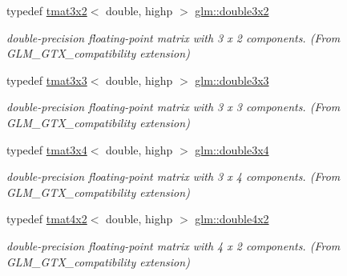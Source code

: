 \begin{DoxyCompactItemize}
typedef \hyperlink{structglm_1_1tmat3x2}{tmat3x2}$<$ double, highp $>$ \hyperlink{group__gtx__compatibility_ga00e4b55452fdffa224a68ead4edffa5a}{glm\+::double3x2}
\begin{DoxyCompactList}\small\item\em double-\/precision floating-\/point matrix with 3 x 2 components. (From G\+L\+M\+\_\+\+G\+T\+X\+\_\+compatibility extension) \end{DoxyCompactList}\item 
\mbox{\label{group__gtx__compatibility_ga3bcec888e1dca957b39c2213b740ff21}} 
typedef \hyperlink{structglm_1_1tmat3x3}{tmat3x3}$<$ double, highp $>$ \hyperlink{group__gtx__compatibility_ga3bcec888e1dca957b39c2213b740ff21}{glm\+::double3x3}
\begin{DoxyCompactList}\small\item\em double-\/precision floating-\/point matrix with 3 x 3 components. (From G\+L\+M\+\_\+\+G\+T\+X\+\_\+compatibility extension) \end{DoxyCompactList}\item 
\mbox{\label{group__gtx__compatibility_gaa30d4862bab3c5aa40225105a06b62cc}} 
typedef \hyperlink{structglm_1_1tmat3x4}{tmat3x4}$<$ double, highp $>$ \hyperlink{group__gtx__compatibility_gaa30d4862bab3c5aa40225105a06b62cc}{glm\+::double3x4}
\begin{DoxyCompactList}\small\item\em double-\/precision floating-\/point matrix with 3 x 4 components. (From G\+L\+M\+\_\+\+G\+T\+X\+\_\+compatibility extension) \end{DoxyCompactList}\item 
\mbox{\label{group__gtx__compatibility_ga66ee22fb774d38f1484670c1afa230da}} 
typedef \hyperlink{structglm_1_1tmat4x2}{tmat4x2}$<$ double, highp $>$ \hyperlink{group__gtx__compatibility_ga66ee22fb774d38f1484670c1afa230da}{glm\+::double4x2}
\begin{DoxyCompactList}\small\item\em double-\/precision floating-\/point matrix with 4 x 2 components. (From G\+L\+M\+\_\+\+G\+T\+X\+\_\+compatibility extension) \end{DoxyCompactList}\item 
\mbox{\label{group__gtx__compatibility_gadad0d5da7181385a05567469d4a5dd9a}} 

\end{DoxyCompactItemize}

